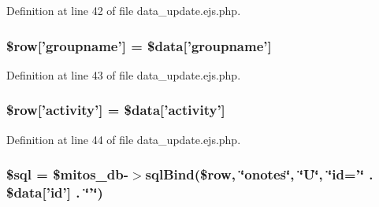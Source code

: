 \-Definition at line 42 of file data\-\_\-update.\-ejs.\-php.

\hypertarget{miscellaneous_2officenotes_2data__update_8ejs_8php_a488a83d63cb6f5d9d30028466b499787}{
\subsubsection[{\$row}]{\setlength{\rightskip}{0pt plus 5cm}\$row\mbox{[}'groupname'\mbox{]} = \$data\mbox{[}'groupname'\mbox{]}}}\label{miscellaneous_2officenotes_2data__update_8ejs_8php_a488a83d63cb6f5d9d30028466b499787}


\-Definition at line 43 of file data\-\_\-update.\-ejs.\-php.

\hypertarget{miscellaneous_2officenotes_2data__update_8ejs_8php_a451ec54fca28dee6d377a2ae931d892f}{
\subsubsection[{\$row}]{\setlength{\rightskip}{0pt plus 5cm}\$row\mbox{[}'activity'\mbox{]} = \$data\mbox{[}'activity'\mbox{]}}}\label{miscellaneous_2officenotes_2data__update_8ejs_8php_a451ec54fca28dee6d377a2ae931d892f}


\-Definition at line 44 of file data\-\_\-update.\-ejs.\-php.

\hypertarget{miscellaneous_2officenotes_2data__update_8ejs_8php_a047170d6020a882807665812a27e2525}{
\subsubsection[{\$sql}]{\setlength{\rightskip}{0pt plus 5cm}\$sql = \$mitos\-\_\-db-\/$>$sql\-Bind(\$row, \char`\"{}onotes\char`\"{}, \char`\"{}\-U\char`\"{}, \char`\"{}id='\char`\"{} . \$data\mbox{[}'id'\mbox{]} . \char`\"{}'\char`\"{})}}\label{miscellaneous_2officenotes_2data__update_8ejs_8php_a047170d6020a882807665812a27e2525}


